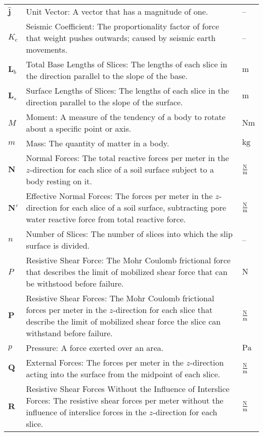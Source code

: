 \documentclass[12pt]{article}
\begin{document}
\begin{longtabu}{l X[l] l}
\\
$\symbf{\hat{j}}$ & Unit Vector: A vector that has a magnitude of one. & --
\\
${K_{\text{c}}}$ & Seismic Coefficient: The proportionality factor of force that weight pushes outwards; caused by seismic earth movements. & --
\\
${\symbf{L}_{b}}$ & Total Base Lengths of Slices: The lengths of each slice in the direction parallel to the slope of the base. & ${\text{m}}$
\\
${\symbf{L}_{s}}$ & Surface Lengths of Slices: The lengths of each slice in the direction parallel to the slope of the surface. & ${\text{m}}$
\\
$M$ & Moment: A measure of the tendency of a body to rotate about a specific point or axis. & $\text{N}\text{m}$
\\
$m$ & Mass: The quantity of matter in a body. & ${\text{kg}}$
\\
$\symbf{N}$ & Normal Forces: The total reactive forces per meter in the $z$-direction for each slice of a soil surface subject to a body resting on it. & $\frac{\text{N}}{\text{m}}$
\\
$\symbf{N'}$ & Effective Normal Forces: The forces per meter in the $z$-direction for each slice of a soil surface, subtracting pore water reactive force from total reactive force. & $\frac{\text{N}}{\text{m}}$
\\
$n$ & Number of Slices: The number of slices into which the slip surface is divided. & --
\\
$P$ & Resistive Shear Force: The Mohr Coulomb frictional force that describes the limit of mobilized shear force that can be withstood before failure. & ${\text{N}}$
\\
$\symbf{P}$ & Resistive Shear Forces: The Mohr Coulomb frictional forces per meter in the $z$-direction for each slice that describe the limit of mobilized shear force the slice can withstand before failure. & $\frac{\text{N}}{\text{m}}$
\\
$p$ & Pressure: A force exerted over an area. & ${\text{Pa}}$
\\
$\symbf{Q}$ & External Forces: The forces per meter in the $z$-direction acting into the surface from the midpoint of each slice. & $\frac{\text{N}}{\text{m}}$
\\
$\symbf{R}$ & Resistive Shear Forces Without the Influence of Interslice Forces: The resistive shear forces per meter without the influence of interslice forces in the $z$-direction for each slice. & $\frac{\text{N}}{\text{m}}$

\end{longtabu}
\end{document}
